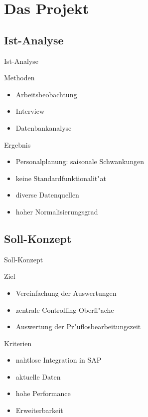 \section{Das Projekt}
\subsection{Ist-Analyse}
\begin{frame}[<+->]{Ist-Analyse}
	\begin{block}{Methoden}
		\begin{itemize}[<+->]
			\item Arbeitsbeobachtung
			\item Interview
			\item Datenbankanalyse
		\end{itemize}
	\end{block}
	\begin{block}{Ergebnis}
		\begin{itemize}[<+->]
			\item Personalplanung: saisonale Schwankungen
			\item keine Standardfunktionalit"at
			\item diverse Datenquellen
			\item hoher Normalisierungsgrad
		\end{itemize}
	\end{block}
\end{frame}

\subsection{Soll-Konzept}
\begin{frame}[<+->]{Soll-Konzept}
	\begin{block}{Ziel}
		\begin{itemize}
			\item Vereinfachung der Auswertungen 
			\item zentrale Controlling-Oberfl"ache
			\item Auswertung der Pr"uflosbearbeitungszeit 
		\end{itemize}
	\end{block}
	
	\begin{block}{Kriterien}
		\begin{itemize}
			\item nahtlose Integration in SAP
			\item aktuelle Daten
			\item hohe Performance
			\item Erweiterbarkeit
		\end{itemize}
	\end{block}

\end{frame}

